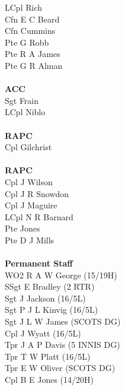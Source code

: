 \begin{multicols}{2}
  LCpl Rich \\
  Cfn E C Beard \\
  Cfn Cummins \\
  Pte G Robb \\
  Pte R A James \\
  Pte G R Alman \\
  \\
  \textbf{ACC} \\
  Sgt Frain \\
  LCpl Niblo \\
  \\
  \textbf{RAPC} \\
  Cpl Gilchrist \\
  \\
  \textbf{RAPC} \\
  Cpl J Wilson \\
  Cpl J R Snowdon \\
  Cpl J Maguire \\
  LCpl N R Barnard \\
  Pte Jones \\
  Pte D J Mills \\
  \\
  \textbf{Permanent Staff} \\
  WO2 R A W George (15/19H) \\
  SSgt E Bradley (2 RTR) \\
  Sgt J Jackson (16/5L) \\
  Sgt P J L Kinvig (16/5L) \\
  Sgt J L W James (SCOTS DG) \\
  Cpl J Wyatt (16/5L) \\
  Tpr J A P Davis (5 INNIS DG) \\
  Tpr T W Platt (16/5L) \\
  Tpr E W Oliver (SCOTS DG) \\
  Cpl B E Jones (14/20H) \\
\end{multicols}

